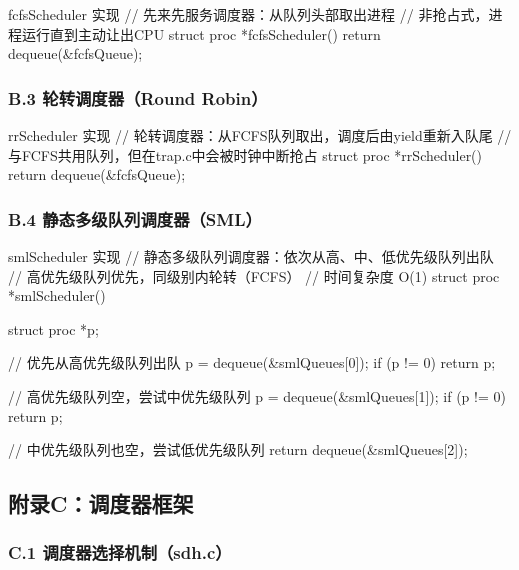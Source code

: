 \documentclass[a4paper, 12pt]{article}
\begin{document}
    \begin{codeblock}{fcfsScheduler 实现}
// 先来先服务调度器：从队列头部取出进程
// 非抢占式，进程运行直到主动让出CPU
struct proc *fcfsScheduler() {
    return dequeue(&fcfsQueue);
}
    \end{codeblock}
    
    \subsubsection{B.3 轮转调度器（Round Robin）}
    
    \begin{codeblock}{rrScheduler 实现}
// 轮转调度器：从FCFS队列取出，调度后由yield重新入队尾
// 与FCFS共用队列，但在trap.c中会被时钟中断抢占
struct proc *rrScheduler() {
    return dequeue(&fcfsQueue);
}
    \end{codeblock}
    
    \subsubsection{B.4 静态多级队列调度器（SML）}
    
    \begin{codeblock}{smlScheduler 实现}
// 静态多级队列调度器：依次从高、中、低优先级队列出队
// 高优先级队列优先，同级别内轮转（FCFS）
// 时间复杂度 O(1)
struct proc *smlScheduler() {
    struct proc *p;
    
    // 优先从高优先级队列出队
    p = dequeue(&smlQueues[0]);
    if (p != 0) return p;
    
    // 高优先级队列空，尝试中优先级队列
    p = dequeue(&smlQueues[1]);
    if (p != 0) return p;
    
    // 中优先级队列也空，尝试低优先级队列
    return dequeue(&smlQueues[2]);
}
    \end{codeblock}
    
    \subsection{附录C：调度器框架}
    
    \subsubsection{C.1 调度器选择机制（sdh.c）}
    
\end{document}
